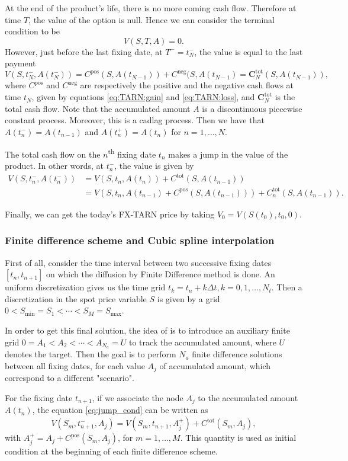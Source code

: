 At the end of the product's life, there is no more coming cash flow. Therefore at time $T$, the value of the option is null. Hence we can consider the terminal condition to be
$$V(S,T,A) = 0.$$
However, just before the  last fixing date, at $T^-=t_N^-$, the value is equal to the last payment 
$$V(S,t_N^-,A(t_N^-)) = C^\text{pos}(S,A(t_{N-1})) + C^\text{neg}(S,A(t_{N-1})=\mathbf{C}^\text{tot}_N(S,A(t_{N-1})),$$
where $C^\text{pos}$ and $C^\text{neg}$ are respectively the positive and the negative cash flows at time $t_N$, given by equations \eqref{eq:TARN:gain} and \eqref{eq:TARN:loss}, and $\mathbf{C}^\text{tot}_N$ is the total cash flow. Note that the accumulated amount $A$ is a discontinuous piecewise constant process. Moreover, this is a cadlag process. Then we have that $A(t_n^-) = A(t_{n-1})$ and $A(t_n^+) = A(t_n)$ for $n = 1,\ldots,N$.

The total cash flow on the $n$\textsuperscript{th} fixing date $t_n$ makes a jump in the value of the product. In other words, at $t_n^-$, the value is given by
\begin{align}\label{eq:jump_cond}
V(S,t_n^-,A(t_n^-)) &= V(S,t_n,A(t_n))+C^\text{tot}(S,A(t_{n-1}))\nonumber\\
&=V(S,t_n,A(t_{n-1})+C^\text{pos}(S,A(t_{n-1})))+C^\text{tot}_n(S,A(t_{n-1})).
\end{align}

Finally, we can get the today's FX-TARN price by taking $ V_0 = V(S(t_0),t_0,0)$.

\subsubsection{Finite difference scheme and Cubic spline interpolation}
First of all, consider the time interval between two successive fixing dates $[t_n,t_{n+1}]$ on which the diffusion by Finite Difference method is done. An uniform discretization gives us the time grid $t_k = t_n + k\Delta t, k = 0,1,\ldots,N_t$. Then a discretization in the spot price variable $S$ is given by a grid $0<S_{\min}=S_1<\cdots<S_M=S_{\max}$.

In order to get this final solution, the idea of \citeauthor{LS15} is to introduce an auxiliary finite grid $0 = A_1<A_2<\cdots<A_{N_a}= U$ to track the accumulated amount, where $U$ denotes the target. Then the goal is to perform $N_a$ finite difference solutions between all fixing dates, for each value $A_j$ of accumulated amount, which correspond to a different "scenario". 

For the fixing date $t_{n+1}$, if we associate the node $A_j$ to the accumulated amount $A(t_{n})$, the equation \eqref{eq:jump_cond} can be written as
$$V(S_m,t^-_{n+1},A_j) = V(S_m,t_{n+1},A^+_j)+ C^\text{tot}(S_m,A_j),$$
with $A_j^+ = A_j + C^\text{pos}(S_m,A_j)$, for $m=1,\ldots,M$. This quantity is used as initial condition at the beginning of each finite difference scheme.


